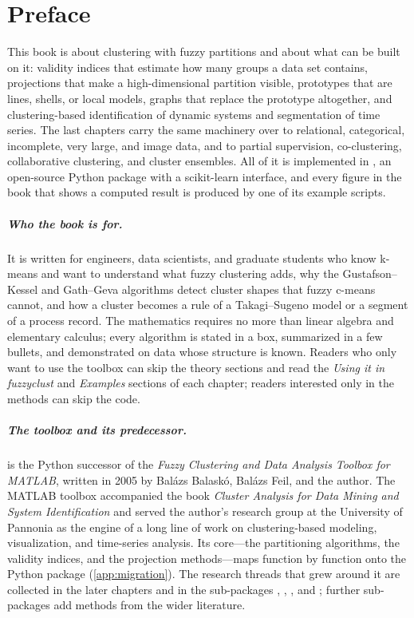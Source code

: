 \chapter*{Preface}\label{ch:preface}

This book is about clustering with fuzzy partitions and about what can be built on it: validity indices that estimate how many groups a data set contains, projections that make a high-dimensional partition visible, prototypes that are lines, shells, or local models, graphs that replace the prototype altogether, and clustering-based identification of dynamic systems and segmentation of time series. The last chapters carry the same machinery over to relational, categorical, incomplete, very large, and image data, and to partial supervision, co-clustering, collaborative clustering, and cluster ensembles. All of it is implemented in , an open-source Python package with a scikit-learn interface, and every figure in the book that shows a computed result is produced by one of its example scripts.

\paragraph{Who the book is for.} It is written for engineers, data scientists, and graduate students who know k-means and want to understand what fuzzy clustering adds, why the Gustafson--Kessel and Gath--Geva algorithms detect cluster shapes that fuzzy c-means cannot, and how a cluster becomes a rule of a Takagi--Sugeno model or a segment of a process record. The mathematics requires no more than linear algebra and elementary calculus; every algorithm is stated in a box, summarized in a few bullets, and demonstrated on data whose structure is known. Readers who only want to use the toolbox can skip the theory sections and read the \emph{Using it in fuzzyclust} and \emph{Examples} sections of each chapter; readers interested only in the methods can skip the code.

\paragraph{The toolbox and its predecessor.}  is the Python successor of the \emph{Fuzzy Clustering and Data Analysis Toolbox for MATLAB}, written in 2005 by Balázs Balaskó, Balázs Feil, and the author. The MATLAB toolbox accompanied the book \emph{Cluster Analysis for Data Mining and System Identification} and served the author's research group at the University of Pannonia as the engine of a long line of work on clustering-based modeling, visualization, and time-series analysis. Its core---the partitioning algorithms, the validity indices, and the projection methods---maps function by function onto the Python package (\cref{app:migration}). The research threads that grew around it are collected in the later chapters and in the sub-packages , , , and ; further sub-packages add methods from the wider literature.


